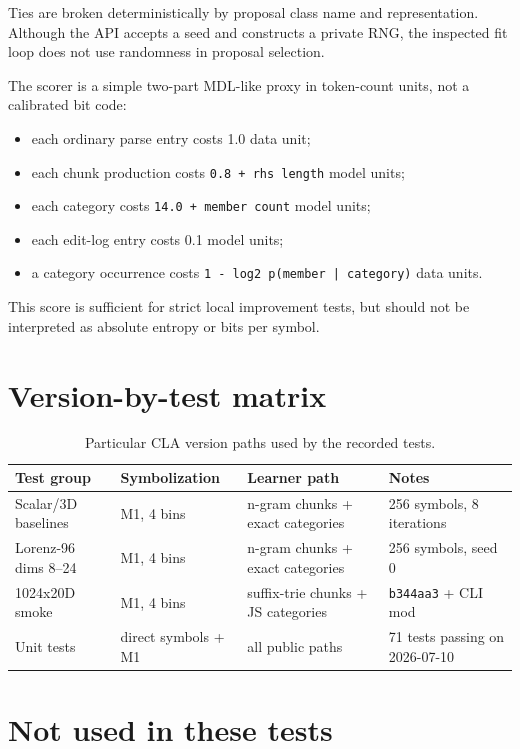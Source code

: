\documentclass[11pt]{article}
\begin{document}
Ties are broken deterministically by proposal class name and representation. Although the API accepts a seed and constructs a private RNG, the inspected fit loop does not use randomness in proposal selection.

The scorer is a simple two-part MDL-like proxy in token-count units, not a calibrated bit code:

\begin{itemize}[leftmargin=*]
\item each ordinary parse entry costs 1.0 data unit;
\item each chunk production costs \texttt{0.8 + rhs length} model units;
\item each category costs \texttt{14.0 + member count} model units;
\item each edit-log entry costs 0.1 model units;
\item a category occurrence costs \texttt{1 - log2 p(member | category)} data units.
\end{itemize}

This score is sufficient for strict local improvement tests, but should not be interpreted as absolute entropy or bits per symbol.

\section{Version-by-test matrix}

\begin{table}[ht]
\centering
\small
\begin{tabular}{llll}
\toprule
Test group & Symbolization & Learner path & Notes \\
\midrule
Scalar/3D baselines & M1, 4 bins & n-gram chunks + exact categories & 256 symbols, 8 iterations \\
Lorenz-96 dims 8--24 & M1, 4 bins & n-gram chunks + exact categories & 256 symbols, seed 0 \\
1024x20D smoke & M1, 4 bins & suffix-trie chunks + JS categories & \texttt{b344aa3} + CLI mod \\
Unit tests & direct symbols + M1 & all public paths & 71 tests passing on 2026-07-10 \\
\bottomrule
\end{tabular}
\caption{Particular CLA version paths used by the recorded tests.}
\end{table}

\section{Not used in these tests}
\end{document}
